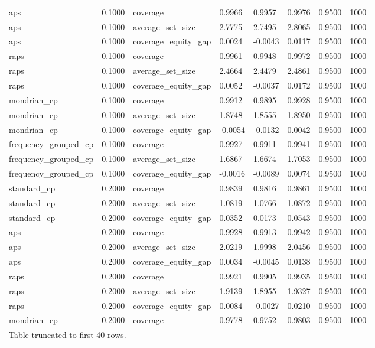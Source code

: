 \begin{table}[htbp]
\begin{tabular}{llllllll}
aps & 0.1000 & coverage & 0.9966 & 0.9957 & 0.9976 & 0.9500 & 1000 \\
aps & 0.1000 & average\_set\_size & 2.7775 & 2.7495 & 2.8065 & 0.9500 & 1000 \\
aps & 0.1000 & coverage\_equity\_gap & 0.0024 & -0.0043 & 0.0117 & 0.9500 & 1000 \\
raps & 0.1000 & coverage & 0.9961 & 0.9948 & 0.9972 & 0.9500 & 1000 \\
raps & 0.1000 & average\_set\_size & 2.4664 & 2.4479 & 2.4861 & 0.9500 & 1000 \\
raps & 0.1000 & coverage\_equity\_gap & 0.0052 & -0.0037 & 0.0172 & 0.9500 & 1000 \\
mondrian\_cp & 0.1000 & coverage & 0.9912 & 0.9895 & 0.9928 & 0.9500 & 1000 \\
mondrian\_cp & 0.1000 & average\_set\_size & 1.8748 & 1.8555 & 1.8950 & 0.9500 & 1000 \\
mondrian\_cp & 0.1000 & coverage\_equity\_gap & -0.0054 & -0.0132 & 0.0042 & 0.9500 & 1000 \\
frequency\_grouped\_cp & 0.1000 & coverage & 0.9927 & 0.9911 & 0.9941 & 0.9500 & 1000 \\
frequency\_grouped\_cp & 0.1000 & average\_set\_size & 1.6867 & 1.6674 & 1.7053 & 0.9500 & 1000 \\
frequency\_grouped\_cp & 0.1000 & coverage\_equity\_gap & -0.0016 & -0.0089 & 0.0074 & 0.9500 & 1000 \\
standard\_cp & 0.2000 & coverage & 0.9839 & 0.9816 & 0.9861 & 0.9500 & 1000 \\
standard\_cp & 0.2000 & average\_set\_size & 1.0819 & 1.0766 & 1.0872 & 0.9500 & 1000 \\
standard\_cp & 0.2000 & coverage\_equity\_gap & 0.0352 & 0.0173 & 0.0543 & 0.9500 & 1000 \\
aps & 0.2000 & coverage & 0.9928 & 0.9913 & 0.9942 & 0.9500 & 1000 \\
aps & 0.2000 & average\_set\_size & 2.0219 & 1.9998 & 2.0456 & 0.9500 & 1000 \\
aps & 0.2000 & coverage\_equity\_gap & 0.0034 & -0.0045 & 0.0138 & 0.9500 & 1000 \\
raps & 0.2000 & coverage & 0.9921 & 0.9905 & 0.9935 & 0.9500 & 1000 \\
raps & 0.2000 & average\_set\_size & 1.9139 & 1.8955 & 1.9327 & 0.9500 & 1000 \\
raps & 0.2000 & coverage\_equity\_gap & 0.0084 & -0.0027 & 0.0210 & 0.9500 & 1000 \\
mondrian\_cp & 0.2000 & coverage & 0.9778 & 0.9752 & 0.9803 & 0.9500 & 1000 \\
\multicolumn{8}{l}{Table truncated to first 40 rows.} \\
\hline
\end{tabular}
\end{table}
